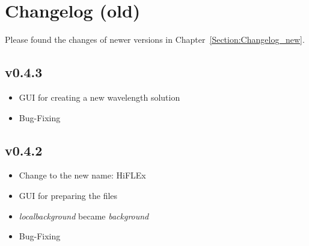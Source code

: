 \documentclass[10pt,a4paper]{article}
\begin{document}


\newpage

\appendix

\section{Changelog (old)}
\label{Section:Changelog_old}
Please found the changes of newer versions in Chapter~\ref{Section:Changelog_new}.

\subsection*{v0.4.3}
\begin{itemize}\setlength\itemsep{0em}
  \item GUI for creating a new wavelength solution
  \item Bug-Fixing
\end{itemize}

\subsection*{v0.4.2}
\begin{itemize}\setlength\itemsep{0em}
  \item Change to the new name: HiFLEx
  \item GUI for preparing the files
  \item \textit{localbackground} became \textit{background}
  \item Bug-Fixing
\end{itemize}
\end{document}
